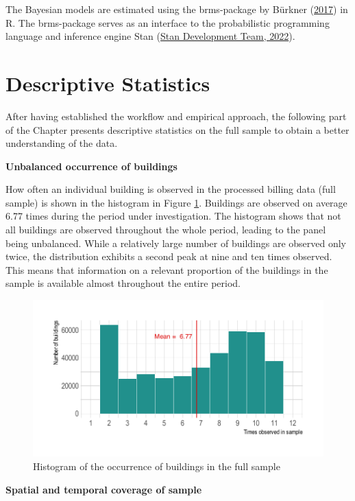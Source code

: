 \documentclass[12pt,twoside]{reedthesis}
\begin{document}
The Bayesian models are estimated using the brms-package by Bürkner (\protect\hyperlink{ref-burkner17}{2017}) in R. The brms-package serves as an interface to the probabilistic programming language and inference engine Stan (\protect\hyperlink{ref-standevelopmentteam22}{Stan Development Team, 2022}).

\hypertarget{descriptives}{%
\section{Descriptive Statistics}\label{descriptives}}

After having established the workflow and empirical approach, the following part of the Chapter presents descriptive statistics on the full sample to obtain a better understanding of the data.

\textbf{Unbalanced occurrence of buildings}

How often an individual building is observed in the processed billing data (full sample) is shown in the histogram in Figure \ref{fig:occurrence-buildings}. Buildings are observed on average 6.77 times during the period under investigation. The histogram shows that not all buildings are observed throughout the whole period, leading to the panel being unbalanced. While a relatively large number of buildings are observed only twice, the distribution exhibits a second peak at nine and ten times observed. This means that information on a relevant proportion of the buildings in the sample is available almost throughout the entire period.
\begin{figure}

{\centering \includegraphics[width=0.75\linewidth]{figure/occurance_buildings} 

}

\caption{Histogram of the occurrence of buildings in the full sample}\label{fig:occurrence-buildings}
\end{figure}
\textbf{Spatial and temporal coverage of sample}
\end{document}
